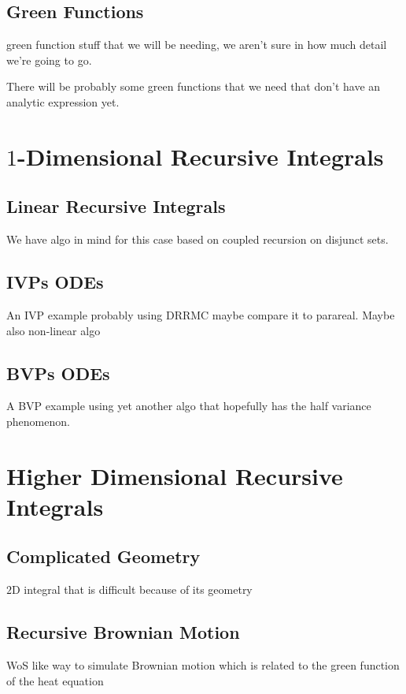 \documentclass[a4paper,12pt]{article}
\begin{document}
\subsection{Green Functions}
green function stuff that we will be needing, we aren't sure in how much detail we're going to go.

\begin{example}
    There will be probably some green functions that we need
    that don't have an analytic expression yet.
\end{example}

\section{$1$-Dimensional Recursive Integrals}

\subsection{Linear Recursive Integrals}
We have algo in mind for this case based on coupled recursion on disjunct sets.


\subsection{IVPs ODEs}
An IVP example probably using DRRMC maybe compare it to parareal. Maybe also non-linear algo

\subsection{BVPs ODEs}
A BVP example using yet another algo that hopefully has the half variance phenomenon.

\section{Higher Dimensional Recursive Integrals}
\subsection{Complicated Geometry}
\begin{example}
    $2$D integral that is difficult because of its geometry
\end{example}

\subsection{Recursive Brownian Motion}
WoS like way to simulate Brownian motion which is related to the green function
of the heat equation
\end{document}
